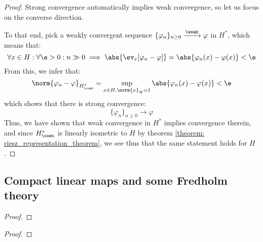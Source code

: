             \begin{proof}
                Strong convergence automatically implies weak convergence, so let us focus on the converse direction.
            
                To that end, pick a weakly convergent sequence $\{\varphi_n\}_{n \geq 0} \xrightarrow[]{\weak} \varphi$ in $H^*$, which means that:
                    $$\forall x \in H: \forall \e > 0: n \gg 0 \implies \abs{\ev_x[\varphi_n - \varphi]} = \abs{\varphi_n(x) - \varphi(x)} < \e$$
                From this, we infer that:
                    $$\norm{ \varphi_n - \varphi }_{H^*_{\cont}} = \sup_{x \in H, \norm{x}_H = 1} \abs{\varphi_n(x) - \varphi(x)} < \e$$
                which shows that there is strong convergence:
                    $$\{\varphi_n\}_{n \geq 0} \to \varphi$$
                Thus, we have shown that weak convergence in $H^*$ implies convergence therein, and since $H^*_{\cont}$ is linearly isometric to $H$ by theorem \ref{theorem: riesz_representation_theorem}, we see thus that the same statement holds for $H$.
            \end{proof}

    \subsection{Compact linear maps and some Fredholm theory}
        \begin{proposition} \label{prop: compact_linear_maps}
        \end{proposition}
            \begin{proof}
                
            \end{proof}

        \begin{proposition} \label{prop: weakly_bounded_sequences}
        \end{proposition}
            \begin{proof}
                
            \end{proof}
